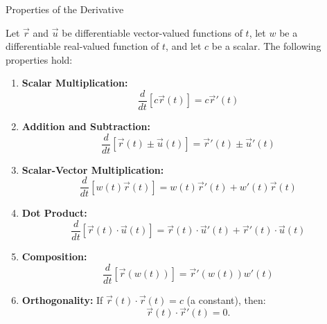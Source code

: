 \documentclass[12pt]{article}
\theoremstyle{beautifulthm}
\begin{document}
\begin{mytheorem}{Properties of the Derivative}{}

    
Let $\vec{r}$ and $\vec{u}$ be differentiable vector-valued functions of $t$, let $w$ be a differentiable real-valued function of $t$, and let $c$ be a scalar. The following properties hold:

\begin{enumerate}
    \item \textbf{Scalar Multiplication:}
    \[
    \frac{d}{dt} \left[ c \vec{r}(t) \right] = c \vec{r}'(t)
    \]

    \item \textbf{Addition and Subtraction:}
    \[
    \frac{d}{dt} \left[ \vec{r}(t) \pm \vec{u}(t) \right] = \vec{r}'(t) \pm \vec{u}'(t)
    \]

    \item \textbf{Scalar-Vector Multiplication:}
    \[
    \frac{d}{dt} \left[ w(t) \vec{r}(t) \right] = w(t) \vec{r}'(t) + w'(t) \vec{r}(t)
    \]

    \item \textbf{Dot Product:}
    \[
    \frac{d}{dt} \left[ \vec{r}(t) \cdot \vec{u}(t) \right] = \vec{r}(t) \cdot \vec{u}'(t) + \vec{r}'(t) \cdot \vec{u}(t)
    \]

    \item \textbf{Composition:}
    \[
    \frac{d}{dt} \left[ \vec{r}(w(t)) \right] = \vec{r}'(w(t)) w'(t)
    \]

    \item \textbf{Orthogonality:}
    If $\vec{r}(t) \cdot \vec{r}(t) = c$ (a constant), then:
    \[
    \vec{r}(t) \cdot \vec{r}'(t) = 0.
    \]
\end{enumerate}
\end{mytheorem}
\end{document}
